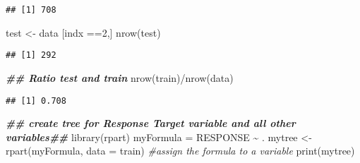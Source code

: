 \documentclass[
]{article}
\newenvironment{Shaded}{\begin{snugshade}}{\end{snugshade}}
\newcommand{\AttributeTok}[1]{\textcolor[rgb]{0.77,0.63,0.00}{#1}}
\newcommand{\CommentTok}[1]{\textcolor[rgb]{0.56,0.35,0.01}{\textit{#1}}}
\newcommand{\DecValTok}[1]{\textcolor[rgb]{0.00,0.00,0.81}{#1}}
\newcommand{\DocumentationTok}[1]{\textcolor[rgb]{0.56,0.35,0.01}{\textbf{\textit{#1}}}}
\newcommand{\FunctionTok}[1]{\textcolor[rgb]{0.00,0.00,0.00}{#1}}
\newcommand{\NormalTok}[1]{#1}
\newcommand{\OtherTok}[1]{\textcolor[rgb]{0.56,0.35,0.01}{#1}}
\newcommand{\SpecialCharTok}[1]{\textcolor[rgb]{0.00,0.00,0.00}{#1}}
\begin{document}
\begin{verbatim}
## [1] 708
\end{verbatim}

\begin{Shaded}
\begin{Highlighting}[]
\NormalTok{test }\OtherTok{\textless{}{-}}\NormalTok{ data [indx }\SpecialCharTok{==}\DecValTok{2}\NormalTok{,]}
\FunctionTok{nrow}\NormalTok{(test)}
\end{Highlighting}
\end{Shaded}

\begin{verbatim}
## [1] 292
\end{verbatim}

\begin{Shaded}
\begin{Highlighting}[]
\DocumentationTok{\#\# Ratio test and train}
\FunctionTok{nrow}\NormalTok{(train)}\SpecialCharTok{/}\FunctionTok{nrow}\NormalTok{(data)}
\end{Highlighting}
\end{Shaded}

\begin{verbatim}
## [1] 0.708
\end{verbatim}

\begin{Shaded}
\begin{Highlighting}[]
\DocumentationTok{\#\# create tree for Response Target variable and all other variables\#\#}
\FunctionTok{library}\NormalTok{(rpart)}
\NormalTok{myFormula }\OtherTok{=}\NormalTok{ RESPONSE }\SpecialCharTok{\textasciitilde{}}\NormalTok{ .}
\NormalTok{mytree  }\OtherTok{\textless{}{-}} \FunctionTok{rpart}\NormalTok{(myFormula, }\AttributeTok{data =}\NormalTok{ train)  }\CommentTok{\#assign the formula to a variable}
\FunctionTok{print}\NormalTok{(mytree)}
\end{Highlighting}
\end{Shaded}
\end{document}
